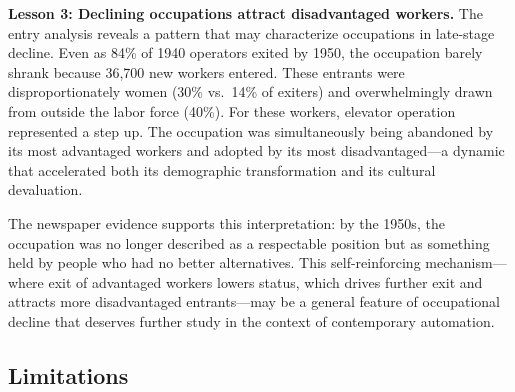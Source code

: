 \documentclass[12pt]{article}
\begin{document}
\textbf{Lesson 3: Declining occupations attract disadvantaged workers.} The entry analysis reveals a pattern that may characterize occupations in late-stage decline. Even as 84\% of 1940 operators exited by 1950, the occupation barely shrank because 36,700 new workers entered. These entrants were disproportionately women (30\% vs.\ 14\% of exiters) and overwhelmingly drawn from outside the labor force (40\%). For these workers, elevator operation represented a step up. The occupation was simultaneously being abandoned by its most advantaged workers and adopted by its most disadvantaged---a dynamic that accelerated both its demographic transformation and its cultural devaluation.

The newspaper evidence supports this interpretation: by the 1950s, the occupation was no longer described as a respectable position but as something held by people who had no better alternatives. This self-reinforcing mechanism---where exit of advantaged workers lowers status, which drives further exit and attracts more disadvantaged entrants---may be a general feature of occupational decline that deserves further study in the context of contemporary automation.

\subsection{Limitations}
\end{document}
